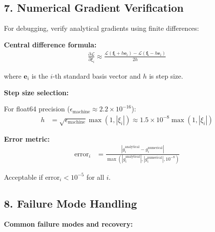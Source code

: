 \documentclass[11pt]{article}
\begin{document}
\subsection*{7. Numerical Gradient Verification}

For debugging, verify analytical gradients using finite differences:

\textbf{Central difference formula:}
\begin{align}
\frac{\partial \mathcal{L}}{\partial \xi_i} \approx \frac{\mathcal{L}(\bm{\xi} + h \bm{e}_i) - \mathcal{L}(\bm{\xi} - h \bm{e}_i)}{2h}
\end{align}

where $\bm{e}_i$ is the $i$-th standard basis vector and $h$ is step size.

\textbf{Step size selection:}

For float64 precision ($\epsilon_{\text{machine}} \approx 2.2 \times 10^{-16}$):
\begin{align}
h &= \sqrt{\epsilon_{\text{machine}}} \max(1, |\xi_i|) \approx 1.5 \times 10^{-8} \max(1, |\xi_i|)
\end{align}

\textbf{Error metric:}
\begin{align}
\text{error}_i &= \frac{|g_i^{\text{analytical}} - g_i^{\text{numerical}}|}{\max(|g_i^{\text{analytical}}|, |g_i^{\text{numerical}}|, 10^{-8})}
\end{align}

Acceptable if $\text{error}_i < 10^{-5}$ for all $i$.

\subsection*{8. Failure Mode Handling}

\textbf{Common failure modes and recovery:}
\end{document}
